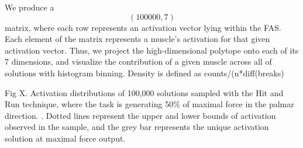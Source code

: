 

We produce a $$(100000,7)$$ matrix, where each row represents an activation vector lying within the FAS. Each element of the matrix represents a muscle's activation for that given activation vector. Thus, we project the high-dimensional polytope onto each of its 7 dimensions, and visualize the contribution of a given muscle across all of solutions with histogram binning. Density is defined as counts/(n*diff(breaks)




Fig X. Activation distributions of 100,000 solutions sampled with the Hit and Run technique, where the task is generating 50\% of maximal force in the palmar direction. . Dotted lines represent the upper and lower bounds of activation observed in the sample, and the grey bar represents the unique activation solution at maximal force output.